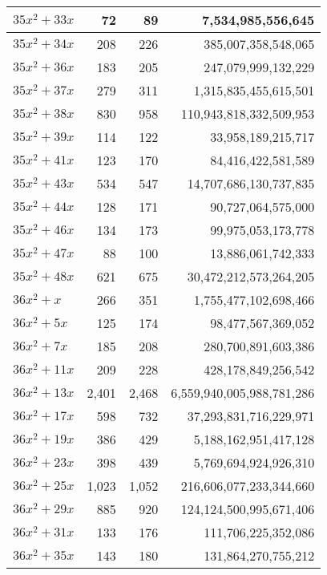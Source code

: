 \documentclass[a4paper]{amsproc}
\theoremstyle{plain}
\begin{document}
\begin{longtable}{ | l | r | r | r | }
$35x^2 + 33x$ & 72 & 89 & 7{,}534{,}985{,}556{,}645 \\ \hline
$35x^2 + 34x$ & 208 & 226 & 385{,}007{,}358{,}548{,}065 \\ \hline
$35x^2 + 36x$ & 183 & 205 & 247{,}079{,}999{,}132{,}229 \\ \hline
$35x^2 + 37x$ & 279 & 311 & 1{,}315{,}835{,}455{,}615{,}501 \\ \hline
$35x^2 + 38x$ & 830 & 958 & 110{,}943{,}818{,}332{,}509{,}953 \\ \hline
$35x^2 + 39x$ & 114 & 122 & 33{,}958{,}189{,}215{,}717 \\ \hline
$35x^2 + 41x$ & 123 & 170 & 84{,}416{,}422{,}581{,}589 \\ \hline
$35x^2 + 43x$ & 534 & 547 & 14{,}707{,}686{,}130{,}737{,}835 \\ \hline
$35x^2 + 44x$ & 128 & 171 & 90{,}727{,}064{,}575{,}000 \\ \hline
$35x^2 + 46x$ & 134 & 173 & 99{,}975{,}053{,}173{,}778 \\ \hline
$35x^2 + 47x$ & 88 & 100 & 13{,}886{,}061{,}742{,}333 \\ \hline
$35x^2 + 48x$ & 621 & 675 & 30{,}472{,}212{,}573{,}264{,}205 \\ \hline
$36x^2 + x$ & 266 & 351 & 1{,}755{,}477{,}102{,}698{,}466 \\ \hline
$36x^2 + 5x$ & 125 & 174 & 98{,}477{,}567{,}369{,}052 \\ \hline
$36x^2 + 7x$ & 185 & 208 & 280{,}700{,}891{,}603{,}386 \\ \hline
$36x^2 + 11x$ & 209 & 228 & 428{,}178{,}849{,}256{,}542 \\ \hline
$36x^2 + 13x$ & 2{,}401 & 2{,}468 & 6{,}559{,}940{,}005{,}988{,}781{,}286 \\ \hline
$36x^2 + 17x$ & 598 & 732 & 37{,}293{,}831{,}716{,}229{,}971 \\ \hline
$36x^2 + 19x$ & 386 & 429 & 5{,}188{,}162{,}951{,}417{,}128 \\ \hline
$36x^2 + 23x$ & 398 & 439 & 5{,}769{,}694{,}924{,}926{,}310 \\ \hline
$36x^2 + 25x$ & 1{,}023 & 1{,}052 & 216{,}606{,}077{,}233{,}344{,}660 \\ \hline
$36x^2 + 29x$ & 885 & 920 & 124{,}124{,}500{,}995{,}671{,}406 \\ \hline
$36x^2 + 31x$ & 133 & 176 & 111{,}706{,}225{,}352{,}086 \\ \hline
$36x^2 + 35x$ & 143 & 180 & 131{,}864{,}270{,}755{,}212 \\ \hline

\end{longtable}
\end{document}
